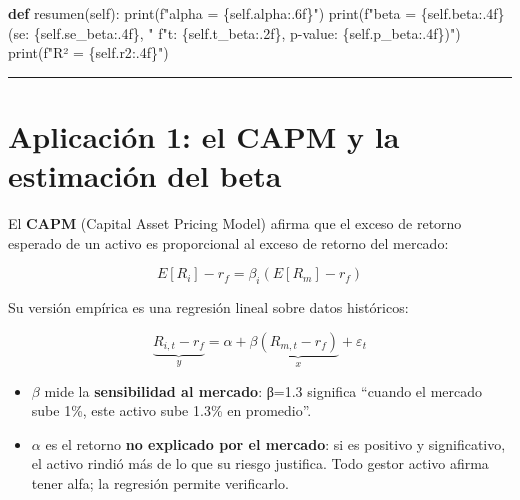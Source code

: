 \documentclass[
  spanish,
  letterpaper,
  DIV=11,
  numbers=noendperiod]{scrreprt}
\newenvironment{Shaded}{\begin{snugshade}}{\end{snugshade}}
\newcommand{\BuiltInTok}[1]{\textcolor[rgb]{0.00,0.23,0.31}{#1}}
\newcommand{\KeywordTok}[1]{\textcolor[rgb]{0.00,0.23,0.31}{\textbf{#1}}}
\newcommand{\NormalTok}[1]{\textcolor[rgb]{0.00,0.23,0.31}{#1}}
\newcommand{\SpecialCharTok}[1]{\textcolor[rgb]{0.37,0.37,0.37}{#1}}
\newcommand{\SpecialStringTok}[1]{\textcolor[rgb]{0.13,0.47,0.30}{#1}}
\newcommand{\VariableTok}[1]{\textcolor[rgb]{0.07,0.07,0.07}{#1}}
\providecommand{\tightlist}{%
  \setlength{\itemsep}{0pt}\setlength{\parskip}{0pt}}
\begin{document}
\begin{Shaded}
\begin{Highlighting}[]
    \KeywordTok{def}\NormalTok{ resumen(}\VariableTok{self}\NormalTok{):}
        \BuiltInTok{print}\NormalTok{(}\SpecialStringTok{f"alpha = }\SpecialCharTok{\{}\VariableTok{self}\SpecialCharTok{.}\NormalTok{alpha}\SpecialCharTok{:.6f\}}\SpecialStringTok{"}\NormalTok{)}
        \BuiltInTok{print}\NormalTok{(}\SpecialStringTok{f"beta  = }\SpecialCharTok{\{}\VariableTok{self}\SpecialCharTok{.}\NormalTok{beta}\SpecialCharTok{:.4f\}}\SpecialStringTok{  (se: }\SpecialCharTok{\{}\VariableTok{self}\SpecialCharTok{.}\NormalTok{se\_beta}\SpecialCharTok{:.4f\}}\SpecialStringTok{, "}
              \SpecialStringTok{f"t: }\SpecialCharTok{\{}\VariableTok{self}\SpecialCharTok{.}\NormalTok{t\_beta}\SpecialCharTok{:.2f\}}\SpecialStringTok{, p{-}value: }\SpecialCharTok{\{}\VariableTok{self}\SpecialCharTok{.}\NormalTok{p\_beta}\SpecialCharTok{:.4f\}}\SpecialStringTok{)"}\NormalTok{)}
        \BuiltInTok{print}\NormalTok{(}\SpecialStringTok{f"R²    = }\SpecialCharTok{\{}\VariableTok{self}\SpecialCharTok{.}\NormalTok{r2}\SpecialCharTok{:.4f\}}\SpecialStringTok{"}\NormalTok{)}
\end{Highlighting}
\end{Shaded}

\begin{center}\rule{0.5\linewidth}{0.5pt}\end{center}

\chapter{Aplicación 1: el CAPM y la estimación del
beta}\label{aplicaciuxf3n-1-el-capm-y-la-estimaciuxf3n-del-beta}

El \textbf{CAPM} (Capital Asset Pricing Model) afirma que el exceso de
retorno esperado de un activo es proporcional al exceso de retorno del
mercado:

\[E[R_i] - r_f = \beta_i \left(E[R_m] - r_f\right)\]

Su versión empírica es una regresión lineal sobre datos históricos:

\[\underbrace{R_{i,t} - r_f}_{y} = \alpha + \beta \underbrace{(R_{m,t} - r_f)}_{x} + \varepsilon_t\]

\begin{itemize}
\tightlist
\item
  \(\beta\) mide la \textbf{sensibilidad al mercado}: β=1.3 significa
  ``cuando el mercado sube 1\%, este activo sube 1.3\% en promedio''.
\item
  \(\alpha\) es el retorno \textbf{no explicado por el mercado}: si es
  positivo y significativo, el activo rindió más de lo que su riesgo
  justifica. Todo gestor activo afirma tener alfa; la regresión permite
  verificarlo.
\end{itemize}
\end{document}

